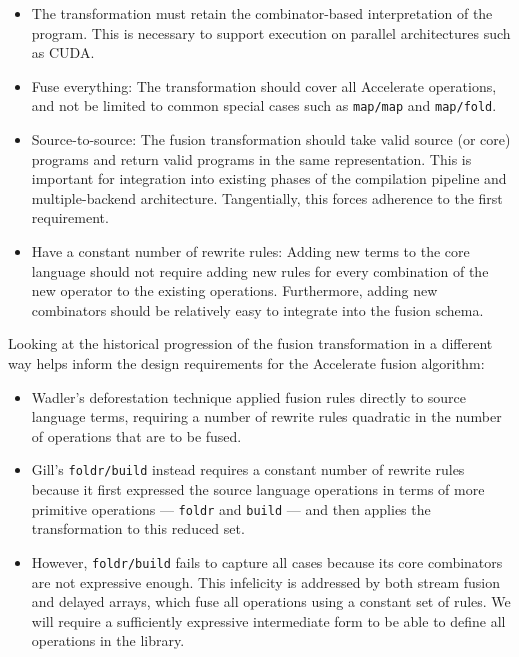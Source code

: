 \begin{itemize}
    \item The transformation must retain the combinator-based interpretation of
        the program. This is necessary to support execution on parallel
        architectures such as CUDA.

    \item Fuse everything: The transformation should cover all Accelerate
        operations, and not be limited to common special cases such as
        \texttt{map/map} and \texttt{map/fold}.

    \item Source-to-source: The fusion transformation should take valid source
        (or core) programs and return valid programs in the same representation.
        This is important for integration into existing phases of the compilation
        pipeline and multiple-backend architecture. Tangentially, this forces
        adherence to the first requirement.

    \item Have a constant number of rewrite rules: Adding new terms to the core
        language should not require adding new rules for every combination of
        the new operator to the existing operations. Furthermore, adding new
        combinators should be relatively easy to integrate into the fusion
        schema.
\end{itemize}
%
Looking at the historical progression of the fusion transformation in a
different way helps inform the design requirements for the Accelerate fusion
algorithm:
%
\begin{itemize}
    \item Wadler's deforestation technique applied fusion rules directly to
        source language terms, requiring a number of rewrite rules quadratic in
        the number of operations that are to be fused.

    \item Gill's \texttt{foldr/build} instead requires
        a constant number of rewrite rules because it first expressed the source
        language operations in terms of more primitive operations ---
        \texttt{foldr} and \texttt{build} --- and then applies the
        transformation to this reduced set.

    \item However, \texttt{foldr/build} fails to
        capture all cases because its core combinators are not expressive
        enough. This infelicity is addressed by both stream
        fusion and delayed arrays, which fuse all operations using a constant set of rules. We
        will require a sufficiently expressive intermediate form to be able to
        define all operations in the library.
\end{itemize}

